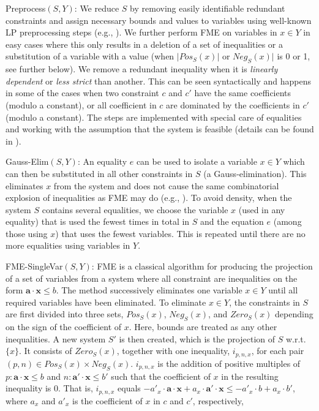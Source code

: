 \documentclass{llncs}
\newcommand{\Pos}{\mathit{Pos}}
\newcommand{\Neg}{\mathit{Neg}}
\newcommand{\mi}{\mathit}
\newcommand{\ve}{\mathbf}
\begin{document}
{{\sc Preprocess}$(S,Y)$:} We reduce $S$ by removing easily identifiable redundant constraints and assign necessary bounds and values to variables using well-known LP preprocessing steps (e.g., \cite{andersen95}). %
We further perform FME on variables in $x\in Y$ in easy cases where this only results in a deletion of a set of inequalities or a substitution of a variable with a value (when $|\Pos_S(x)|$ or $\Neg_S(x)|$ is 0 or 1, see further below). We remove a redundant inequality when it is \emph{linearly dependent} or \emph{less strict} than another. This can be seen syntactically and happens in some of the cases when two constraint $c$ and $c'$ have the same coefficients (modulo a constant), or all coefficient in $c$ are dominated by the coefficients in $c'$ (modulo a constant). 
The steps are implemented with special care of equalities and working with the assumption that the system is feasible (details can be found in \cite{mytechrep}).

{{\sc Gauss-Elim}$(S,Y)$:} An equality $e$ can be used to isolate a variable $x\in Y$ which can then be substituted in all other constraints in $S$ (a Gauss-elimination). This eliminates $x$ from the system and does not cause the same combinatorial explosion of inequalities as FME may do (e.g., \cite{duffin74,simon05}).
To avoid density, when the system $S$ contains several equalities, we choose the variable $x$ (used in any equality) that is used the fewest times in total in $S$ and the equation $e$ (among those using $x$) that uses the fewest variables. 
This is repeated until there are no more equalities using variables in $Y$.

{{\sc FME-SingleVar}$(S,Y)$:} FME is a classical algorithm for producing the projection of a set of variables from a system where all constraint are inequalities on the form $\ve{a}\cdot \ve{x}\leq b$. The method successively eliminates one variable $x\in Y$ until all required variables have been eliminated. To eliminate $x\in Y$, the constraints in $S$ are first divided into three sets, $\Pos_S(x)$, $\Neg_S(x)$, and $\mi{Zero}_S(x)$ depending on the sign of the coefficient of $x$. Here, bounds are treated as any other inequalities. 
A new system $S'$ is then created, which is the projection of $S$ w.r.t. $\{x\}$. It consists of $\mi{Zero}_S(x)$, together with one inequality, $i_{p,n,x}$, for each pair $(p,n)\in \Pos_S(x)\times \Neg_S(x)$. $i_{p,n,x}$ is the addition of positive multiples of $p:\ve{a}\cdot\ve{x} \leq b$ and $n:\ve{a}'\cdot\ve{x} \leq b'$ such that the coefficient of $x$ in the resulting inequality is $0$. That is, $i_{p,n,x}$ equals $-a'_x\cdot \ve{a}\cdot\ve{x} + a_x\cdot \ve{a}'\cdot\ve{x} \leq -a'_x\cdot b + a_x\cdot b'$, where $a_x$ and $a'_x$ is the coefficient of $x$ in $c$ and $c'$, respectively,
\end{document}
